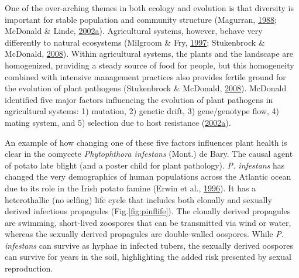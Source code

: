 \documentclass[double,11pt]{beavtex}
\begin{document}
  One of the over-arching themes in both ecology and evolution is that
  diversity is important for stable population and community structure
  (Magurran, \protect\hyperlink{ref-magurran1988diversity}{1988}; McDonald
  \& Linde,
  \protect\hyperlink{ref-mcdonald2002pathogen}{2002}\protect\hyperlink{ref-mcdonald2002pathogen}{a}).
  Agricultural systems, however, behave very differently to natural
  ecosystems (Milgroom \& Fry,
  \protect\hyperlink{ref-milgroom1997contributions}{1997}; Stukenbrock \&
  McDonald, \protect\hyperlink{ref-stukenbrock2008origins}{2008}). Within
  agricultural systems, the plants and the landscape are homogenized,
  providing a steady source of food for people, but this homogeneity
  combined with intensive management practices also provides fertile
  ground for the evolution of plant pathogens (Stukenbrock \& McDonald,
  \protect\hyperlink{ref-stukenbrock2008origins}{2008}). McDonald
  identified five major factors influencing the evolution of plant
  pathogens in agricultural systems: 1) mutation, 2) genetic drift, 3)
  gene/genotype flow, 4) mating system, and 5) selection due to host
  resistance
  (\protect\hyperlink{ref-mcdonald2002pathogen}{2002}\protect\hyperlink{ref-mcdonald2002pathogen}{a}).
  
  An example of how changing one of these five factors influences plant
  health is clear in the oomycete \emph{Phytophthora infestans} (Mont.) de
  Bary. The causal agent of potato late blight (and a poster child for
  plant pathology). \emph{P. infestans} has changed the very demographics
  of human populations across the Atlantic ocean due to its role in the
  Irish potato famine (Erwin et al.,
  \protect\hyperlink{ref-erwin1996phytophthora}{1996}). It has a
  heterothallic (no selfing) life cycle that includes both clonally and
  sexually derived infectious propagules (Fig.\ref{fig:pinflife}). The
  clonally derived propagules are swimming, short-lived zoospores that can
  be transmitted via wind or water, whereas the sexually derived
  propagules are double-walled oospores. While \emph{P. infestans} can
  survive as hyphae in infected tubers, the sexually derived oospores can
  survive for years in the soil, highlighting the added risk presented by
  sexual reproduction.
  
\end{document}
